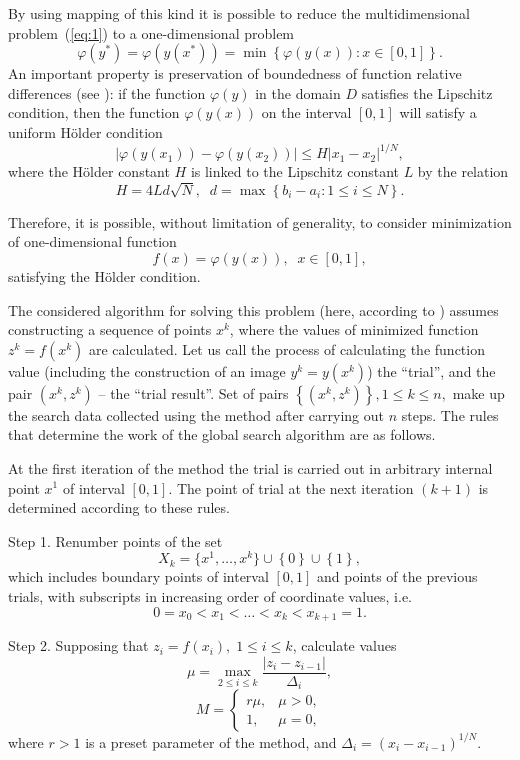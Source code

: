 \documentclass[smallcondensed]{svjour3}     %
\begin{document}
By using mapping of this kind it is possible to reduce the multidimensional problem~(\ref{eq:1}) to a one-dimensional problem
\[
\varphi(y^\ast)=\varphi(y(x^\ast))=\min{\left\{\varphi(y(x)): x\in[0,1]\right\}}.
\]
An important property is preservation of boundedness of function relative differences  (see \cite{RefStrongin2000}): if the function $\varphi(y)$ in the domain $D$ satisfies the Lipschitz condition, then the function $\varphi(y(x))$ on the interval $[0,1]$ will satisfy a uniform H{\"o}lder condition
\[
\left|\varphi(y(x_1))-\varphi(y(x_2))\right|\leq H\left|x_1-x_2\right|^{1/N},
\]
where the H{\"o}lder constant $H$ is linked to the Lipschitz constant $L$ by the relation
\[
H=4Ld\sqrt{N},\;\; d=\max{\left\{b_i-a_i:1\leq i \leq N\right\}}.
\]

Therefore, it is possible, without limitation of generality, to consider minimization of one-dimensional function
\[
f(x)=\varphi(y(x)), \;\; x\in[0,1],
\]
satisfying the H{\"o}lder condition.

The considered algorithm for solving this problem (here, according to \cite{RefStrongin2000}) assumes constructing a sequence of points $x^k$, where the values of minimized function $z^k = f(x^k)$ are calculated. Let us call the process of calculating the function value (including the construction of an image $y^k=y(x^k)$) the ``trial'', and the pair $(x^k, z^k)$ --  the ``trial result''. Set of pairs $\left\{(x^k, z^k)\right\}, 1\leq k\leq n,$ make up the search data collected using the method after carrying out $n$ steps. The rules that determine the work of the global search algorithm are as follows.

At the first iteration of the method the trial is carried out in arbitrary internal point $x^1$ of interval $[0,1]$. The point of trial at the next iteration $(k+1)$ is determined according to these rules.

Step 1. Renumber points of the set
\[
X_k=\{x^1,\dots,x^k\}\cup\left\{0\right\}\cup\left\{1\right\},
\]
which includes boundary points of interval $[0,1]$ and points of the previous trials, with subscripts in increasing order of coordinate values, i.e.
\[
0=x_0<x_1<\dots <x_k<x_{k+1}=1.
\]

Step 2. Supposing that  $z_i=f(x_i), \; 1\leq i \leq k$, calculate values 
\begin{equation}\label{eq:11}
\mu = \max_{2\leq i \leq k}\frac{\left|z_i-z_{i-1}\right|}{\Delta_i},
\end{equation}
\[
M = \left\{
   \begin{array}{lr}
     r\mu, & \mu > 0,\\
     1, & \mu = 0,
   \end{array}
\right.
 \]
where $r>1$ is a preset parameter of the method, and $\Delta_i=\left(x_i-x_{i-1}\right)^{1/N}$.
\end{document}
